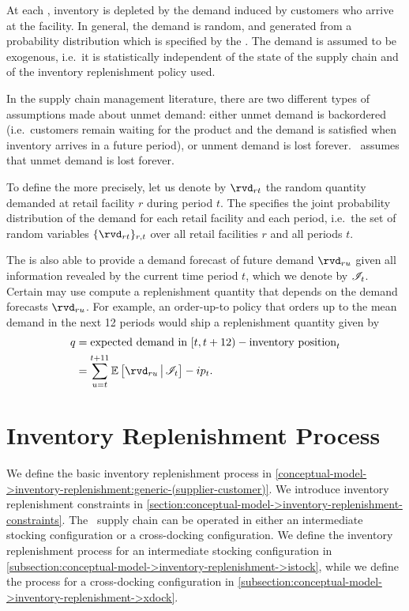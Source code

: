 At each ,
inventory is depleted by the demand
induced by customers who arrive at the facility.
In general, the demand is random,
and generated from a probability distribution
which is specified by the .
The demand is assumed to be exogenous,
i.e.\ it is statistically independent
of the state of the supply chain
and of the inventory replenishment policy used.

In the supply chain management literature,
there are two different types of assumptions made about unmet demand:
either unmet demand is backordered
(i.e.\ customers remain waiting for the product
and the demand is satisfied when inventory arrives in a future period),
or unment demand is lost forever.
\scs\ assumes that unmet demand is lost forever.

To define the  more precisely,
let us denote by $\rvd_{rt}$
the random quantity demanded at retail facility $r$ during period $t$.
The  specifies the joint probability distribution
of the demand for each retail facility and each period,
i.e.\ the set of random variables $\{\rvd_{rt}\}_{r,t}$
over all retail facilities $r$ and all periods $t$.

The  is also able to provide
a demand forecast of future demand $\rvd_{ru}$
given all information revealed by the current time period $t$,
which we denote by $\mathscr{I}_t$.
Certain 
may use compute a replenishment quantity
that depends on the demand forecasts $\rvd_{ru}$.
For example,
an order-up-to policy
that orders up to the mean demand in the next 12 periods
would ship a replenishment quantity given by
\begin{align*}
    q
  &=
    \text{expected demand in } [t, t+12) - \text{inventory position}_t
\\
  &=
    \sum_{u=t}^{t+11} \cEX{\rvd_{ru}}{\info_t} - ip_t.
\end{align*}






\section{Inventory Replenishment Process}
\label{section:conceptual-model->inventory-replenishment} 

We define the basic inventory replenishment process
in \autoref{conceptual-model->inventory-replenishment:generic-(supplier-customer)}.
We introduce inventory replenishment constraints
in \autoref{section:conceptual-model->inventory-replenishment-constraints}.
The \scs\ supply chain can be operated
in either an intermediate stocking configuration
or a cross-docking configuration.
We define the inventory replenishment process
for an intermediate stocking configuration
in \autoref{subsection:conceptual-model->inventory-replenishment->istock},
while we define the process
for a cross-docking configuration
in \autoref{subsection:conceptual-model->inventory-replenishment->xdock}.






